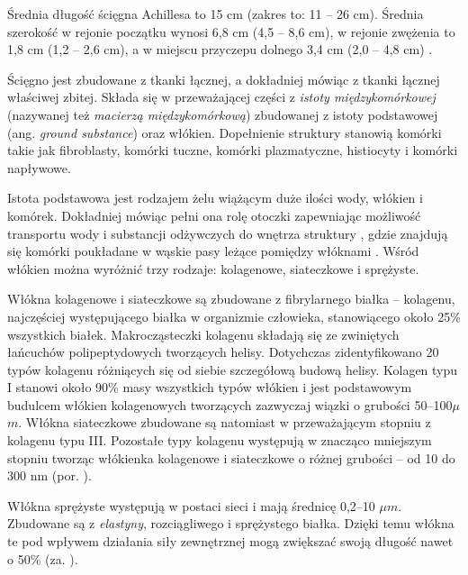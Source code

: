 Średnia długość ścięgna Achillesa to 15 cm (zakres to: 11 -- 26 cm). Średnia szerokość w rejonie początku wynosi 6,8 cm (4,5 -- 8,6 cm), w rejonie zwężenia to 1,8 cm (1,2 -- 2,6 cm), a w miejscu przyczepu dolnego 3,4 cm (2,0 -- 4,8 cm) \cite{Doral2010, KoivunenNiemel1995}.

Ścięgno jest zbudowane z tkanki łącznej, a dokładniej mówiąc z tkanki łącznej właściwej zbitej. Składa się w przeważającej części z \textit{istoty międzykomórkowej} (nazywanej też \textit{macierzą międzykomórkową}) zbudowanej z istoty podstawowej (ang. \textit{ground substance}) oraz włókien. Dopełnienie struktury stanowią komórki takie jak fibroblasty, komórki tuczne, komórki plazmatyczne, histiocyty i komórki napływowe. 

Istota podstawowa jest rodzajem żelu wiążącym duże ilości wody, włókien i komórek. Dokładniej mówiąc pełni ona rolę otoczki zapewniając możliwość transportu wody i substancji odżywczych do wnętrza struktury \cite{Sharma2006}, gdzie znajdują się komórki poukładane w wąskie pasy leżące pomiędzy włóknami \cite{Maffulli2005}. Wśród włókien można wyróżnić trzy rodzaje: kolagenowe, siateczkowe i sprężyste.

Włókna kolagenowe i siateczkowe są zbudowane z fibrylarnego białka -- kolagenu, najczęściej występującego białka w organizmie człowieka, stanowiącego około 25\% wszystkich białek. Makrocząsteczki kolagenu składają się ze zwiniętych łańcuchów polipeptydowych tworzących helisy. Dotychczas zidentyfikowano 20 typów kolagenu różniących się od siebie szczegółową budową helisy. Kolagen typu I stanowi około 90\% masy wszystkich typów włókien i jest podstawowym budulcem włókien kolagenowych tworzących zazwyczaj wiązki o grubości 50--100$\mu$$m$. Włókna siateczkowe zbudowane są natomiast w przeważającym stopniu z kolagenu typu III. Pozostałe typy kolagenu występują w znacząco mniejszym stopniu tworząc włókienka kolagenowe i siateczkowe o różnej grubości -- od 10 do 300 nm (por. \cite{sawicki2008histologia}).

Włókna sprężyste występują w postaci sieci i mają średnicę 0,2--10 $\mu$$m$. Zbudowane są z \textit{elastyny}, rozciągliwego i sprężystego białka. Dzięki temu włókna te pod wpływem działania siły zewnętrznej mogą zwiększać swoją długość nawet o 50\% (za. \cite{sawicki2008histologia}). 

